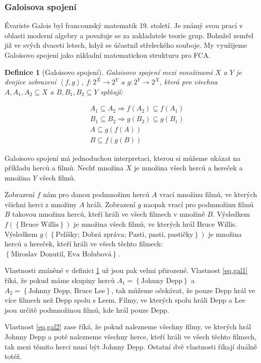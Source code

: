\documentclass[12pt]{article}
\newcommand{\sssection}[1]{\subsubsection{#1}}
\newcommand{\adds}[1]{\left\{#1\right\}}
\newcommand{\addsp}[1]{\left<#1\right>}
\renewcommand{\implies}{\Rightarrow}
\newtheorem{mydef}{Definice}
\begin{document}
\sssection{Galoisova spojení}

Évariste Galois byl francouzský matematik 19. století. Je známý svou prací v oblasti moderní algebry a považuje se za zakladatele teorie grup. Bohužel zemřel již ve svých dvaceti letech, když se účastnil střeleckého souboje. My využijeme Galoisovo spojení jako základní matematickou strukturu pro FCA.

\begin{mydef}[Galoisovo spojení] \label{def.gal}
Galoisovo spojení mezi množinami $X$ a $Y$ je dvojice zobrazení $\addsp{f,g}$, $f:2^X\rightarrow2^Y$ a $g:2^Y\rightarrow2^X$, která pro všechna $A, A_1, A_2\subseteq X$ a $B, B_1, B_2\subseteq Y$ splňují:

\begin{eqnarray}
&&A_1\subseteq A_2\implies f(A_2)\subseteq f(A_1)\label{eq.gal1}\\
&&B_1\subseteq B_2\implies g(B_2)\subseteq g(B_1)\\
&&A\subseteq g(f(A))\label{eq.gal2}\\
&&B\subseteq f(g(B))
\end{eqnarray}
\end{mydef}

Galoisovo spojení má jednoduchou interpretaci, kterou si můžeme ukázat na příkladu herců a filmů. Nechť množina $X$ je množina všech herců a hereček a množina $Y$ všech filmů. 

Zobrazení $f$ nám pro danou podmnožinu herců $A$ vrací množinu filmů, ve kterých všichni herci z množiny $A$ hráli. Zobrazení $g$ naopak vrací pro podmnožinu filmů $B$ takovou množinu herců, kteří hráli ve všech filmech v množině $B$. Výsledkem $f(\adds{\mbox{Bruce Willis}})$ je množina všech filmů, ve kterých hrál Bruce Willis. Výsledkem $g(\adds{\mbox{Pelíšky; Dobrá zpráva; Pasti, pasti, pastičky}})$ je množina herců a hereček, kteří hráli ve všech těchto filmech: $\adds{\mbox{Miroslav Donutil, Eva Holubová}}$.

Vlastnosti zmíněné v definici \ref{def.gal} už jsou pak velmi přirozené. Vlastnost \ref{eq.gal1} říká, že pokud máme skupiny herců $A_1=\adds{\mbox{Johnny Depp}}$ a $A_2=\adds{\mbox{Johnny Depp, Bruce Lee}}$, tak můžeme očekávat, že pouze Depp hrál ve více filmech než Depp spolu s Leem. Filmy, ve kterých spolu hráli Depp a Lee jsou určitě podmnožinou filmů, kde hrál pouze Depp.

Vlastnost \ref{eq.gal2} zase říká, že pokud nalezneme všechny filmy, ve kterých hrál Johnny Depp a poté nalezneme všechny herce, kteří hráli ve všech těchto filmech, tak mezi těmito herci musí být Johnny Depp. Ostatní dvě vlastnosti říkají duálně totéž. 
\end{document}
